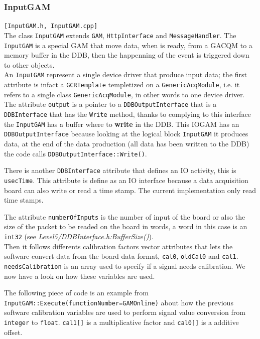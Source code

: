 \subsubsection{InputGAM}
\texttt{[InputGAM.h, InputGAM.cpp]}\\
The class \texttt{InputGAM} extends \texttt{GAM}, \texttt{HttpInterface} and \texttt{MessageHandler}. The \texttt{InputGAM} is a special GAM that move data, when is ready, from a GACQM  to a memory buffer in the DDB, then the happenning of the event is triggered down to other objects. \\


An \texttt{InputGAM} represent a single device driver that produce input data; the first attribute is infact a \texttt{GCRTemplate} templetized on a \texttt{GenericAcqModule}, i.e. it refers to a single class \texttt{GenericAcqModule}, in other words to one device driver. The attribute \texttt{output} is a pointer to a \texttt{DDBOutputInterface} that is a \texttt{DDBInterface} that has the \texttt{Write} method, thanks to complying to this interface the \texttt{InputGAM} has a buffer where to \textbf{write} in the DDB. This IOGAM has an \texttt{DDBOutputInterface} because looking at the logical block \texttt{InputGAM} it produces data, at the end of the data production (all data has been written to the DDB) the code calls \texttt{DDBOutputInterface::Write()}.

There is another \texttt{DDBInterface} attribute that defines an IO activity, this is \texttt{usecTime}. This attribute is define as an IO interface because a data acquisition board can also write or read a time stamp. The current implementation only read time stamps.

The attribute \texttt{numberOfInputs} is the number of input of the board or also the size of the packet to be readed on the board in words, a word in this case is an \texttt{int32} (see \textit{Level5/DDBInterface.h:BufferSize()}).\\


Then it follows differents calibration factors vector attributes that lets the software convert data from the board data format, \texttt{cal0}, \texttt{oldCal0} and \texttt{cal1}. \texttt{needsCalibration} is an array used to specify if a signal needs calibration. We now have a look on how these variables are used.

The following piece of code is an example from \texttt{InputGAM::Execute(functionNumber=GAMOnline)} about how the previous software calibration variables are used to perform signal value conversion from \texttt{integer} to \texttt{float}. \texttt{cal1[]} is a multiplicative factor and \texttt{cal0[]} is a additive offset.

